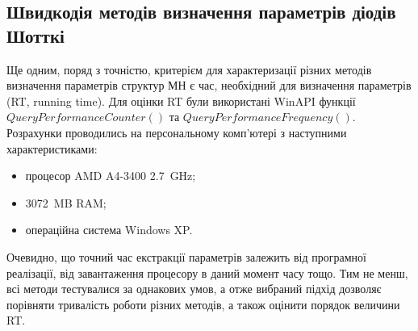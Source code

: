 \subsection{Швидкодія методів визначення параметрів діодів Шотткі}
Ще одним, поряд з точністю, критерієм для характеризації різних методів визначення параметрів структур МН є час, необхідний для визначення параметрів (RT, running time).
Для оцінки RT були використані WinAPI функції $QueryPerformanceCounter()$ та $QueryPerformanceFrequency()$.
Розрахунки проводились на персональному комп'ютері з наступними характеристиками:
\begin{itemize}
  \item процесор AMD A4-3400 2.7~GHz;
  \item 3072~MB RAM;
  \item операційна система Windows XP.
\end{itemize}
Очевидно, що точний час екстракції параметрів залежить від програмної реалізації, від завантаження процесору в даний момент часу тощо.
Тим не менш, всі методи тестувалися за однакових умов, а отже вибраний підхід дозволяє порівняти тривалість роботи різних методів, а також оцінити порядок величини RT.

